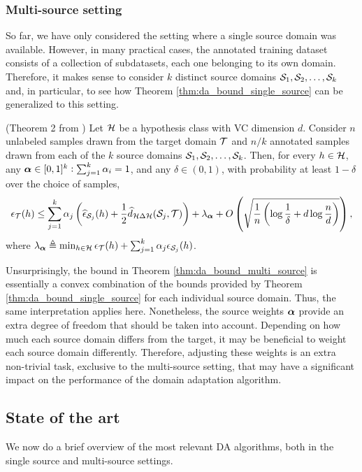 \subsubsection{Multi-source setting}
\label{sec:da_theory_ms}
So far, we have only considered the setting where a single source domain was available. However, in many practical cases, the annotated training dataset consists of a collection of subdatasets, each one belonging to its own domain. Therefore, it makes sense to consider $k$ distinct source domains ${\mathcal{S}}_1, {\mathcal{S}}_2, \dots, {\mathcal{S}}_k$ and, in particular, to see how Theorem \ref{thm:da_bound_single_source} can be generalized to this setting.
\begin{theorem}
    \label{thm:da_bound_multi_source}
    (Theorem 2 from \citet{Zhao2018}) Let ${\mathcal{H}}$ be a hypothesis class with VC dimension $d$. Consider $n$ unlabeled samples drawn from the target domain ${\mathcal{T}}$ and $n/k$ annotated samples drawn from each of the $k$ source domains ${\mathcal{S}}_1, {\mathcal{S}}_2, \dots, {\mathcal{S}}_k$. Then, for every $h \in {\mathcal{H}}$, any ${\bm{\alpha}} \in [0,1]^k: \sum_{j=1}^k {\alpha}_i = 1$, and any $\delta \in (0,1)$, with probability at least $1-\delta$ over the choice of samples,
    \begin{equation}
        \label{eq:da_bound_multi_source}
        \epsilon_{\mathcal{T}}(h) \leq \sum_{j=1}^k {\alpha}_j \left(\widehat{\epsilon}_{{\mathcal{S}}_j}(h) + \frac{1}{2} \widehat{d}_{{\mathcal{H}} \Delta {\mathcal{H}}}({\mathcal{S}}_j, {\mathcal{T}})\right) + \lambda_{\bm{\alpha}} + O \left(\sqrt{\frac{1}{n} \left(\log \frac{1}{\delta} +d \log \frac{n}{d} \right)} \right),
    \end{equation}
    where $\lambda_{\bm{\alpha}} \triangleq \min_{h \in {\mathcal{H}}} \epsilon_{\mathcal{T}}(h) + \sum_{j=1}^k {\alpha}_j \epsilon_{{\mathcal{S}}_j}(h)$.
\end{theorem}
Unsurprisingly, the bound in Theorem \ref{thm:da_bound_multi_source} is essentially a convex combination of the bounds provided by Theorem \ref{thm:da_bound_single_source} for each individual source domain. Thus, the same interpretation applies here. Nonetheless, the source weights ${\bm{\alpha}}$ provide an extra degree of freedom that should be taken into account. Depending on how much each source domain differs from the target, it may be beneficial to weight each source domain differently. Therefore, adjusting these weights is an extra non-trivial task, exclusive to the multi-source setting, that may have a significant impact on the performance of the domain adaptation algorithm.

\subsection{State of the art}
\label{sec:da_sota}
We now do a brief overview of the most relevant DA algorithms, both in the single source and multi-source settings.

